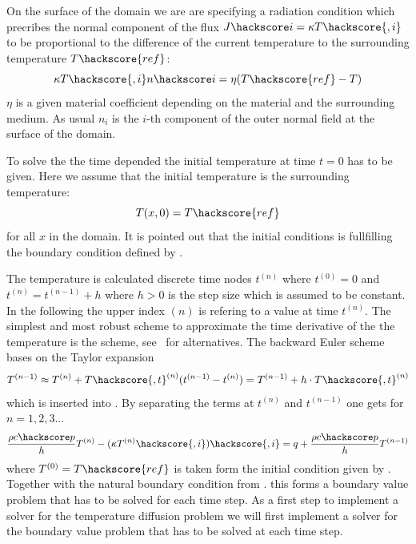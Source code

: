 On the surface of the domain we are 
are specifying a radiation condition 
which precribes the normal component of the flux $J\hackscore i= \kappa T\hackscore{,i}$ to be proportional
to the difference of the current temperature to the surrounding temperature $T\hackscore{ref}$:    
\begin{equation}
 \kappa T\hackscore{,i} n\hackscore i = \eta (T\hackscore{ref}-T) 
\label{DIFFUSION TEMP EQ 2}
\end{equation}
$\eta$ is a given material coefficient depending on the material and the surrounding medium. 
As usual $n_i$ is the $i$-th component of the outer normal field 
at the surface of the domain. 

To solve the the time depended  the initial temperature at time 
$t=0$ has to be given. Here we assume that the initial temperature is the surrounding temperature:
\begin{equation}
T(x,0)=T\hackscore{ref} 
\label{DIFFUSION TEMP EQ 4}
\end{equation}
for all $x$ in the domain. It is pointed out that 
the initial conditions is fullfilling the 
boundary condition defined by . 

The temperature is calculated discrete time nodes $t^{(n)}$ where 
$t^{(0)}=0$ and  $t^{(n)}=t^{(n-1)}+h$ where $h>0$ is the step size which is assumed to be constant. 
In the following the upper index ${(n)}$ is refering to a value at time $t^{(n)}$. The simplest
and most robust scheme to approximate the time derivative of the the temperature is the 
 scheme, see~\cite{XXX} for alternatives. The backward Euler scheme bases
on the Taylor expansion
\begin{equation}
T^{(n-1)}\approx T^{(n)}+T\hackscore{,t}^{(n)}(t^{(n-1)}-t^{(n)})
=T^{(n-1)} + h \cdot T\hackscore{,t}^{(n)}
\label{DIFFUSION TEMP EQ 6}
\end{equation}
which is inserted into . By separating the terms at 
$t^{(n)}$ and  $t^{(n-1)}$ one gets for $n=1,2,3\ldots$
\begin{equation}
\frac{\rho c\hackscore p}{h} T^{(n)} - (\kappa T^{(n)}\hackscore{,i})\hackscore{,i} = q +  \frac{\rho c\hackscore p}{h} T^{(n-1)}
\label{DIFFUSION TEMP EQ 7}
\end{equation}
where $T^{(0)}=T\hackscore{ref}$ is taken form the initial condition given by .
Together with the natural boundary condition from .
this forms a boundary value problem that has to be solved for each time step. 
As a first step to implement a solver for the temperature diffusion problem we will 
first implement a solver for the  boundary value problem that has to be solved at each time step.

